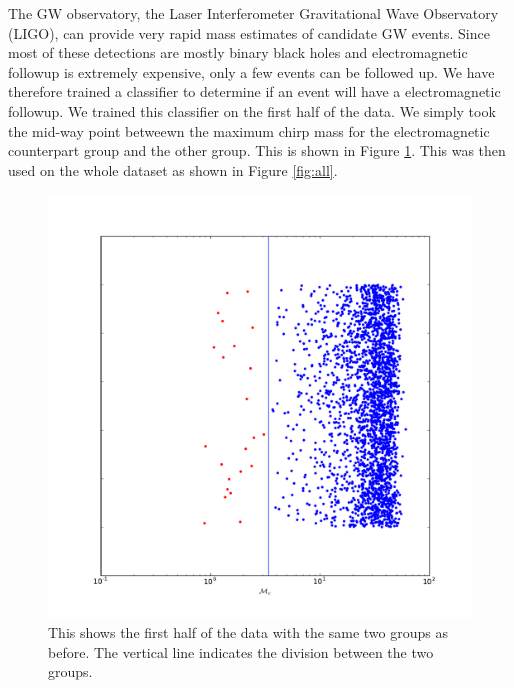 The GW observatory, the Laser Interferometer Gravitational Wave Observatory (LIGO), can provide very rapid mass estimates of candidate GW events. Since most of these detections are mostly binary black holes and electromagnetic followup is extremely expensive, only a few events can be followed up. We have therefore trained a classifier to determine if an event will have a electromagnetic followup. We trained this classifier on the first half of the data. We simply took the mid-way point betweewn the maximum chirp mass for the electromagnetic counterpart group and the other group. This is shown in Figure \ref{fig:half}. This was then used on the whole dataset as shown in Figure \ref{fig:all}.

\begin{figure}
\includegraphics[width=\columnwidth]{output/jake/classifier_half.pdf}
\caption{This shows the first half of the data with the same two groups as before. The vertical line indicates the division between the two groups.}
\label{fig:half}
\end{figure}
